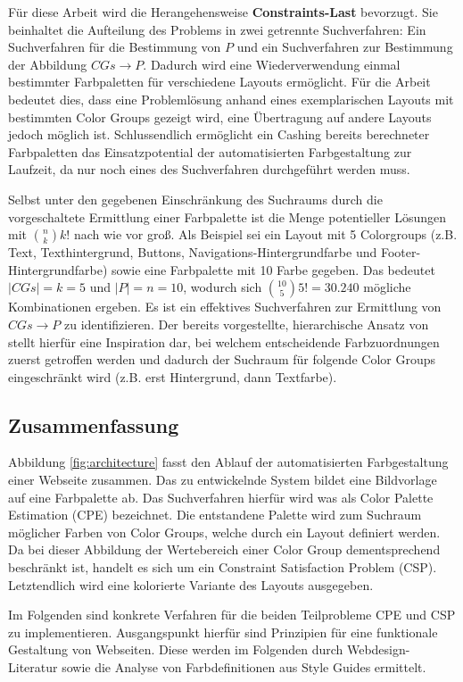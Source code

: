 \documentclass[11pt, bibliography=totoc]{scrartcl}
\begin{document}
Für diese Arbeit wird die Herangehensweise \textbf{Constraints-Last} bevorzugt. Sie beinhaltet die Aufteilung des Problems in zwei getrennte Suchverfahren: Ein Suchverfahren für die Bestimmung von $P$ und ein Suchverfahren zur Bestimmung der Abbildung $CGs \to P$. Dadurch wird eine Wiederverwendung einmal bestimmter Farbpaletten für verschiedene Layouts ermöglicht. Für die Arbeit bedeutet dies, dass eine Problemlösung anhand eines exemplarischen Layouts mit bestimmten Color Groups gezeigt wird, eine Übertragung auf andere Layouts jedoch möglich ist. Schlussendlich ermöglicht ein Cashing bereits berechneter Farbpaletten das Einsatzpotential der automatisierten Farbgestaltung zur Laufzeit, da nur noch eines des Suchverfahren durchgeführt werden muss.

Selbst unter den gegebenen Einschränkung des Suchraums durch die vorgeschaltete Ermittlung einer Farbpalette ist die Menge potentieller Lösungen mit $\binom{n}{k} k!$ nach wie vor groß. Als Beispiel sei ein Layout mit 5 Colorgroups (z.B. Text, Texthintergrund, Buttons, Navigations-Hintergrundfarbe und Footer-Hintergrundfarbe) sowie eine Farbpalette mit 10 Farbe gegeben. Das bedeutet $|CGs| = k = 5$ und $|P| = n = 10$, wodurch sich $\binom{10}{5} 5! = 30.240$ mögliche Kombinationen ergeben. Es ist ein effektives Suchverfahren zur Ermittlung von $CGs \to P$ zu identifizieren. Der bereits vorgestellte, hierarchische Ansatz von \citet{documentpalette} stellt hierfür eine Inspiration dar, bei welchem entscheidende Farbzuordnungen zuerst getroffen werden und dadurch der Suchraum für folgende Color Groups eingeschränkt wird (z.B. erst Hintergrund, dann Textfarbe).

\subsection*{Zusammenfassung}

Abbildung \ref{fig:architecture} fasst den Ablauf der automatisierten Farbgestaltung einer Webseite zusammen. Das zu entwickelnde System bildet eine Bildvorlage auf eine Farbpalette ab. Das Suchverfahren hierfür wird was als Color Palette Estimation (CPE) bezeichnet. Die entstandene Palette wird zum Suchraum möglicher Farben von Color Groups, welche durch ein Layout definiert werden. Da bei dieser Abbildung der Wertebereich einer Color Group dementsprechend beschränkt ist, handelt es sich um ein Constraint Satisfaction Problem (CSP). Letztendlich wird eine kolorierte Variante des Layouts ausgegeben.

Im Folgenden sind konkrete Verfahren für die beiden Teilprobleme CPE und CSP zu implementieren. Ausgangspunkt hierfür sind Prinzipien für eine funktionale Gestaltung von Webseiten. Diese werden im Folgenden durch Webdesign-Literatur sowie die Analyse von Farbdefinitionen aus Style Guides ermittelt.
\end{document}
